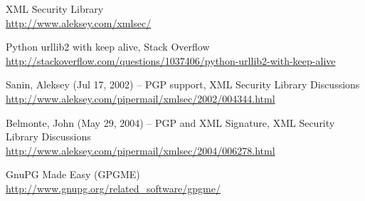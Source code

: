 \begin{thebibliography}{99}
XML Security Library\\
\url{http://www.aleksey.com/xmlsec/}

Python urllib2 with keep alive, Stack Overflow\\
\url{http://stackoverflow.com/questions/1037406/python-urllib2-with-keep-alive}

Sanin, Aleksey (Jul 17, 2002) -- PGP support, XML Security Library Discussions\\
\url{http://www.aleksey.com/pipermail/xmlsec/2002/004344.html}

Belmonte, John (May 29, 2004) -- PGP and XML Signature, XML Security Library Discussions\\
\url{http://www.aleksey.com/pipermail/xmlsec/2004/006278.html}

GnuPG Made Easy (GPGME)\\
\url{http://www.gnupg.org/related_software/gpgme/}

\end{thebibliography}

